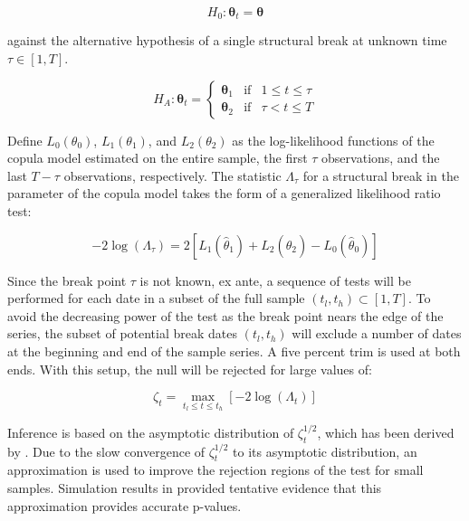 \begin{equation}
	H_{0}:\boldsymbol{\theta}_{t} = \boldsymbol{\theta}
\end{equation}

against the alternative hypothesis of a single structural break at unknown time $\tau \in \left[1, T\right]$.

\begin{equation}
H_{A}:\boldsymbol{\theta}_{t} = \left\{
\begin{array}{ccc}
    \boldsymbol{\theta}_{1} & \text{if} & 1\leq t \leq \tau \\ 
    \boldsymbol{\theta}_{2} & \text{if} & \tau < t \leq T
\end{array}
\right. 
\end{equation}

Define $L_{0}\left(\theta_{0}\right)$, $L_{1}\left(\theta_{1}\right)$, and $L_{2}\left(\theta_{2}\right)$ as the log-likelihood functions of the copula model estimated on the entire sample, the first $\tau$ observations, and the last $T-\tau$ observations, respectively. The statistic $\Lambda_{\tau}$ for a structural break in the parameter of the copula model takes the form of a generalized likelihood ratio test:

\begin{equation}
	-2\log \left(\Lambda_{\tau}\right) = 2\left[L_{1}\left(\hat{\theta}_{1}\right) + L_{2}\left(\hat{\theta}_{2}\right) - L_{0}\left(\hat{\theta}_{0}\right)\right]
\end{equation}

Since the break point $\tau$ is not known, ex ante, a sequence of tests will be performed for each date in a subset of the full sample $\left(t_{l},t_{h}\right) \subset \left[1, T\right]$. To avoid the decreasing power of the test as the break point nears the edge of the series, the subset of potential break dates $\left( t_{l},t_{h}\right)$ will exclude a number of dates at the beginning and end of the sample series. A five percent trim is used at both ends. With this setup, the null will be rejected for large values of:

\begin{equation}
	\zeta_{t}=\max_{t_{l}\leq t\leq t_{h}}\left[ -2\log \left( \Lambda _{t}\right)\right]
\end{equation}

Inference is based on the asymptotic distribution of $\zeta_{t}^{1/2}$, which has been derived by \cite{Csorgo_and_Horvath_1997}. Due to the slow convergence of $\zeta_{t}^{1/2}$ to its asymptotic distribution, an approximation is used to improve the rejection regions of the test for small samples. Simulation results in \cite{Dias_and_Embrechts_2004} provided tentative evidence that this approximation provides accurate p-values.

